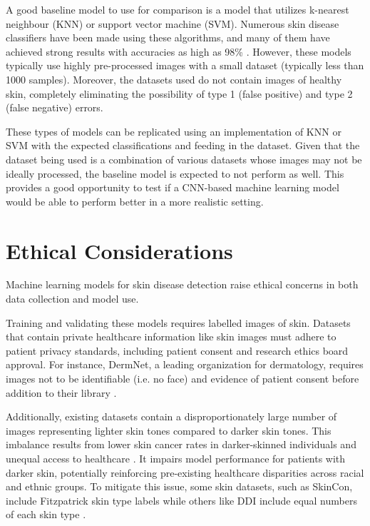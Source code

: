 \documentclass{article} %
\begin{document}
A good baseline model to use for comparison is a model that utilizes k-nearest neighbour (KNN) or support vector machine (SVM). Numerous skin disease classifiers have been made using these algorithms, and many of them have achieved strong results with accuracies as high as 98\% \citep{sumithra2015segmentation,hatem2022skin,bakheet2017svm,das2013svm}. However, these models typically use highly pre-processed images with a small dataset (typically less than 1000 samples). Moreover, the datasets used do not contain images of healthy skin, completely eliminating the possibility of type 1 (false positive) and type 2 (false negative) errors.

These types of models can be replicated using an implementation of KNN or SVM with the expected classifications and feeding in the dataset. Given that the dataset being used is a combination of various datasets whose images may not be ideally processed, the baseline model is expected to not perform as well. This provides a good opportunity to test if a CNN-based machine learning model would be able to perform better in a more realistic setting.

\section{Ethical Considerations}
\label{sec:ethics}

Machine learning models for skin disease detection raise ethical concerns in both data collection and model use.

Training and validating these models requires labelled images of skin. Datasets that contain private healthcare information like skin images must adhere to patient privacy standards, including patient consent and research ethics board approval. For instance, DermNet, a leading organization for dermatology, requires images not to be identifiable (i.e. no face) and evidence of patient consent before addition to their library \citep{dermnet2025clinical}.

Additionally, existing datasets contain a disproportionately large number of images representing lighter skin tones compared to darker skin tones. This imbalance results from lower skin cancer rates in darker-skinned individuals and unequal access to healthcare \citep{alipour2024skin}. It impairs model performance for patients with darker skin, potentially reinforcing pre-existing healthcare disparities across racial and ethnic groups. To mitigate this issue, some skin datasets, such as SkinCon, include Fitzpatrick skin type labels while others like DDI include equal numbers of each skin type \citep{daneshjou2022skincon,daneshjou2022disparities}.
\end{document}
